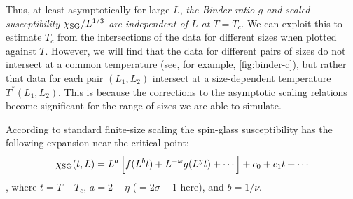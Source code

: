 Thus, at least asymptotically for large $L$, \emph{the Binder ratio $g$ and
  scaled susceptibility $\chi_{\mathrm{SG}}/L^{1/3}$ are independent of $L$ at $T=T_c$}.
We can exploit this to estimate $T_c$ from the intersections of the data for
different sizes when plotted against $T$. However, we will find that the data
for different pairs of sizes do not intersect at a common temperature (see, for
example, \cref{fig:binder-c}), but rather that data for each pair $(L_1,L_2)$
intersect at a size-dependent temperature $T^*(L_1,L_2)$. This is because the
corrections to the asymptotic scaling relations become significant for the
range of sizes we are able to simulate.

According to standard finite-size scaling the spin-glass susceptibility has
the following expansion near the critical point:
\begin{equation}
    \sgsusc(t,L)
    = L^a \sbr{f(L^b t) + L^{-\omega} g(L^y t) + \cdots}
      + c_0 + c_1 t + \cdots
    \label{eq:standard-fss}
\end{equation}
\autocite{privman1983finite},
where $t=T-T_c$, $a=2-\eta$ ($=2\sigma-1$ here), and $b=1/\nu$.

